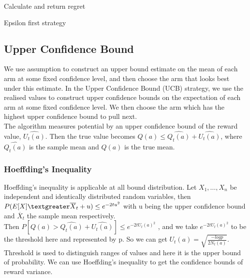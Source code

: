 {\begin{algorithm}[H]
        Calculate and return regret
        \caption{Epsilon first strategy}\label{alg:epsilon_algorithm}
    \end{algorithm}

    \subsection{Upper Confidence Bound}\label{subsec:upper-confidence-bound}
    We use assumption to construct an upper bound estimate on the mean of each arm at some fixed confidence level, and then choose the arm that looks best under this estimate. \citep{SVGarbar2012} In the Upper Confidence Bound (UCB) strategy, we use the realised values to construct upper confidence bounds on the expectation of each arm at some fixed confidence level.
    We then choose the arm which has the highest upper confidence bound to pull next.
    \\The algorithm measures potential by an upper confidence bound of the reward value, $\widehat{U_t (a)}$.
    Then the true value becomes $ Q(a)  \leq \widehat{Q_t (a)}+\widehat{U_t (a)} $, where  $ \widehat{Q_t (a)}$ is the sample mean and $ Q(a)$ is the true mean.

    \subsubsection{Hoeffding’s Inequality}
    Hoeffding's inequality is applicable at all bound distribution.
    Let $X_1, \dots, X_n$ be independent and identically distributed random variables, then $ P(E[X]  \textgreater \overline  X_t + u) \leq e^{-2t u^2}$ with u being the upper confidence bound and $ \overline X_t $ the sample mean respectively. \citep{Hoeffding1963}
    \\Then $ P[Q(a) >\widehat{Q_t (a)}+\widehat{U_t (a)}] \leq e^{-2t U_t(a)^2}$ , and we take $e^{-2t U_t(a)^2} $ to be the threshold here and represented by p.
    So we can get $U_t(a) = \sqrt{\frac{-log p}{2N_t (a)}}$.
    Threshold is used to distinguish ranges of values and here it is the upper bound of probability.
    We can use Hoeffding's inequality to get the confidence bounds of reward variance.

}
